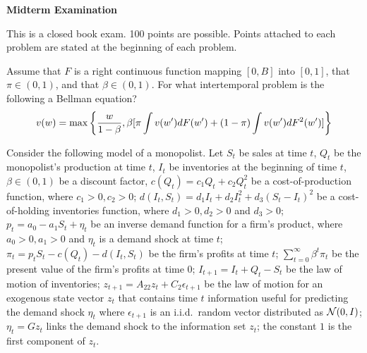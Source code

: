 
\paper

\overfullrule=0pt
\def\frac#1#2{#1\over #2}
%
\def\bmatrix#1{\left[ \matrix{#1} \right]}
\def\be{{\beta}}
\def\toone{{t+1}}

\overfullrule=0pt

%

\centerline{\bf Midterm Examination}


\medskip

  This is a closed book  exam.  100 points are possible. Points attached to each problem are stated
at the beginning of each problem.

\medskip

  Assume that  $F$ is a   right continuous function mapping $[0, B]$ into $[0,1]$, that $\pi \in (0,1)$, and  that $\beta \in (0,1)$.
For what intertemporal problem is the following a Bellman equation?
$$ v(w) = \max\left\{ {w\over{1-\beta}},  \beta [  \pi \int v(w') d F(w') + (1-\pi) \int v(w') d F^2(w') ]  \right\} $$

\medskip



\medskip
{} Consider the following model of a monopolist.  Let  $S_t$ be sales at time $t$, $Q_t$ be the monopolist's production  at time $t$,
 $I_t$ be inventories at the beginning of time $t$,  $\beta \in (0,1)$ be a discount factor,  $c(Q_t) = c_1 Q_t + c_2 Q_t^2$ be a cost-of-production function, where $c_1>0, c_2>0$;
  $d(I_t, S_t) = d_1 I_t + d_2 I_t^2  + d_3 (S_t - I_t)^2$ be a cost-of-holding inventories function, where $d_1 >0, d_2 >0 $ and $d_3 >0$;
$p_t = a_0 - a_1 S_t + \eta_t $ be an inverse demand function for a firm's product, where $a_0>0, a_1 >0$ and $\eta_t$ is a demand shock at time  $t$;
   $\pi_t = p_t S_t - c(Q_t) - d(I_t, S_t) $ be the firm's profits at time $t$;
   $\sum_{t=0}^\infty \beta^t \pi_t $ be the present value of the firm's profits at time $0$;  $I_{t+1} = I_t + Q_t - S_t$ be the law of motion of inventories;
 $z_{t+1} = A_{22} z_t + C_2 \epsilon_{t+1} $ be the law of motion for an exogenous state vector $z_t$ that contains time $t$ information useful for predicting the demand shock $\eta_t$ where
 $\epsilon_{t+1}$ is an i.i.d.~random vector distributed as ${\cal N}(0,I)$;
   $\eta_t = G z_t $ links the demand shock to the information set $z_t$;
   the constant $1$ is the first component of $z_t$.

